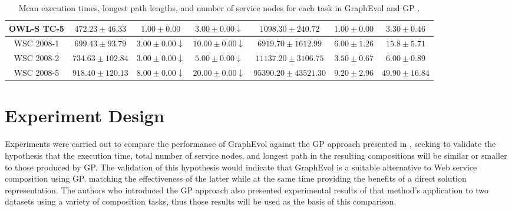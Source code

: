 \documentclass{article}
\begin{document}
\begin{table}[ht]
{\begin{tabular}{c|c|c|c|c|c|c|}
\multicolumn{1}{|c|}{OWL-S TC-5}    & $472.23 \pm 46.33$      & $1.00 \pm 0.00$       & $3.00 \pm 0.00\downarrow$                                    & $1098.30 \pm 240.72$                         & $1.00 \pm 0.00$       & $3.30 \pm 0.46$               \\ \hline
\multicolumn{1}{|c|}{WSC 2008-1}    & $699.43 \pm 93.79$      & $3.00 \pm 0.00\downarrow$       & $10.00 \pm 0.00\downarrow$                                   & $6919.70 \pm 1612.99$                        & $6.00 \pm 1.26$       & $15.8 \pm 5.71$               \\ \hline
\multicolumn{1}{|c|}{WSC 2008-2}    & $734.63 \pm 102.84$     & $3.00 \pm 0.00\downarrow$       & $5.00 \pm 0.00\downarrow$                                    & $11137.20 \pm 3106.75$                       & $3.50 \pm 0.67$       & $6.00 \pm 0.89$               \\ \hline
\multicolumn{1}{|c|}{WSC 2008-5}    & $918.40 \pm 120.13$     & $8.00 \pm 0.00\downarrow$       & $20.00 \pm 0.00\downarrow$                                   & $95390.20 \pm 43521.30$                      & $9.20 \pm 2.96$       & $49.90 \pm 16.84$             \\ \hline
\end{tabular}}
\caption{Mean execution times, longest path lengths, and number of service nodes for each task in GraphEvol and GP \protect\cite{rodriguez2010composition}.}
\label{resultsTable}
\end{table}

\section{Experiment Design}\label{experimentdesign}
Experiments were carried out to compare the performance of GraphEvol against the GP approach presented in \cite{rodriguez2010composition}, seeking to validate
the hypothesis that the execution time, total number of service nodes, and longest path in the resulting compositions will be similar or smaller to those produced
by GP. The validation of this hypothesis would indicate that GraphEvol is a suitable alternative to Web service composition using GP, matching the effectiveness of the
latter while at the same time providing the benefits of a direct solution representation. The authors who introduced the GP approach also presented experimental
results of that method's application to two datasets using a variety of composition tasks, thus those results will be used as the basis of this comparison.
\end{document}
